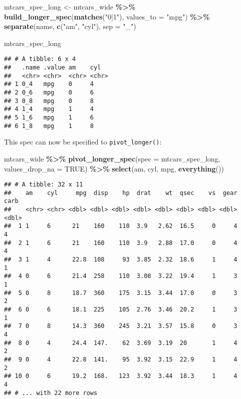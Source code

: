 \documentclass[
]{article}
\newenvironment{Shaded}{\begin{snugshade}}{\end{snugshade}}
\newcommand{\DataTypeTok}[1]{\textcolor[rgb]{0.13,0.29,0.53}{#1}}
\newcommand{\KeywordTok}[1]{\textcolor[rgb]{0.13,0.29,0.53}{\textbf{#1}}}
\newcommand{\NormalTok}[1]{#1}
\newcommand{\OperatorTok}[1]{\textcolor[rgb]{0.81,0.36,0.00}{\textbf{#1}}}
\newcommand{\OtherTok}[1]{\textcolor[rgb]{0.56,0.35,0.01}{#1}}
\newcommand{\StringTok}[1]{\textcolor[rgb]{0.31,0.60,0.02}{#1}}
\begin{document}
\begin{Shaded}
\begin{Highlighting}[]
\NormalTok{mtcars\_spec\_long \textless{}{-}}\StringTok{ }\NormalTok{mtcars\_wide }\OperatorTok{\%\textgreater{}\%}\StringTok{ }
\StringTok{  }\KeywordTok{build\_longer\_spec}\NormalTok{(}\KeywordTok{matches}\NormalTok{(}\StringTok{"0|1"}\NormalTok{), }\DataTypeTok{values\_to =} \StringTok{"mpg"}\NormalTok{) }\OperatorTok{\%\textgreater{}\%}\StringTok{ }
\StringTok{  }\KeywordTok{separate}\NormalTok{(name, }\KeywordTok{c}\NormalTok{(}\StringTok{"am"}\NormalTok{, }\StringTok{"cyl"}\NormalTok{), }\DataTypeTok{sep =} \StringTok{"\_"}\NormalTok{)}

\NormalTok{mtcars\_spec\_long}
\end{Highlighting}
\end{Shaded}

\begin{verbatim}
## # A tibble: 6 x 4
##   .name .value am    cyl  
##   <chr> <chr>  <chr> <chr>
## 1 0_4   mpg    0     4    
## 2 0_6   mpg    0     6    
## 3 0_8   mpg    0     8    
## 4 1_4   mpg    1     4    
## 5 1_6   mpg    1     6    
## 6 1_8   mpg    1     8
\end{verbatim}

This spec can now be specified to \texttt{pivot\_longer()}:

\begin{Shaded}
\begin{Highlighting}[]
\NormalTok{mtcars\_wide }\OperatorTok{\%\textgreater{}\%}\StringTok{ }
\StringTok{  }\KeywordTok{pivot\_longer\_spec}\NormalTok{(}\DataTypeTok{spec =}\NormalTok{ mtcars\_spec\_long, }\DataTypeTok{values\_drop\_na =} \OtherTok{TRUE}\NormalTok{) }\OperatorTok{\%\textgreater{}\%}\StringTok{ }
\StringTok{  }\KeywordTok{select}\NormalTok{(am, cyl, mpg, }\KeywordTok{everything}\NormalTok{())}
\end{Highlighting}
\end{Shaded}

\begin{verbatim}
## # A tibble: 32 x 11
##    am    cyl     mpg  disp    hp  drat    wt  qsec    vs  gear  carb
##    <chr> <chr> <dbl> <dbl> <dbl> <dbl> <dbl> <dbl> <dbl> <dbl> <dbl>
##  1 1     6      21    160    110  3.9   2.62  16.5     0     4     4
##  2 1     6      21    160    110  3.9   2.88  17.0     0     4     4
##  3 1     4      22.8  108     93  3.85  2.32  18.6     1     4     1
##  4 0     6      21.4  258    110  3.08  3.22  19.4     1     3     1
##  5 0     8      18.7  360    175  3.15  3.44  17.0     0     3     2
##  6 0     6      18.1  225    105  2.76  3.46  20.2     1     3     1
##  7 0     8      14.3  360    245  3.21  3.57  15.8     0     3     4
##  8 0     4      24.4  147.    62  3.69  3.19  20       1     4     2
##  9 0     4      22.8  141.    95  3.92  3.15  22.9     1     4     2
## 10 0     6      19.2  168.   123  3.92  3.44  18.3     1     4     4
## # ... with 22 more rows
\end{verbatim}
\end{document}
